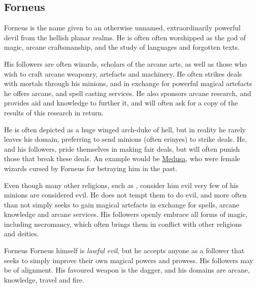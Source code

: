 \subsection{Forneus}
\label{sec:Forneus}

Forneus is the name given to an otherwise unnamed, extraordinarily powerful
devil from the hellish planar realms. He is often often worshipped as the god
of magic, arcane craftsmanship, and the study of languages and forgotten texts.

His followers are often wizards, scholars of the arcane arts, as well as those
who wish to craft arcane weaponry, artefacts and machinery. He often strikes
deals with mortals through his minions, and in exchange for powerful magical
artefacts he offers arcane, and spell casting services. He also sponsors arcane
research, and provides aid and knowledge to further it, and will often ask for
a copy of the results of this research in return.

He is often depicted as a huge winged arch-duke of hell, but in reality he
rarely leaves his domain, preferring to send minions (often erinyes) to strike
deals. He, and his followers, pride themselves in making fair deals, but will
often punish those that break these deals. An example would be
\hyperref[sec:Medusa]{Medusa}, who were female wizards cursed by Forneus for
betraying him in the past.

Even though many other religions, such as , consider him evil
very few of his minions are considered evil. He does not tempt them to do
evil, and more often than not simply seeks to gain magical artefacts in
exchange for spells, arcane knowledge and arcane services. His followers openly
embrace all forms of magic, including necromancy, which often brings them in
conflict with other religions and deities.

\begin{35e}{Forneus}
  Forneus himself is \emph{lawful evil}, but he accepts anyone as a follower
  that seeks to simply improve their own magical powers and prowess. His
  followers may be of alignment. His favoured weapon is the dagger, and his
  domains are arcane, knowledge, travel and fire.
\end{35e}

